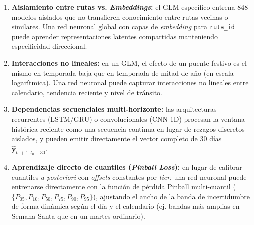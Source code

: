 \documentclass[11pt,a4paper]{article}
\begin{document}
\begin{enumerate}[leftmargin=1.5em]
    \item \textbf{Aislamiento entre rutas vs. \textit{Embeddings}:} el GLM específico entrena 848 modelos aislados que no transfieren conocimiento entre rutas vecinas o similares. Una red neuronal global con capas de \textit{embedding} para \texttt{ruta\_id} puede aprender representaciones latentes compartidas manteniendo especificidad direccional.
    \item \textbf{Interacciones no lineales:} en un GLM, el efecto de un puente festivo es el mismo en temporada baja que en temporada de mitad de año (en escala logarítmica). Una red neuronal puede capturar interacciones no lineales entre calendario, tendencia reciente y nivel de tránsito.
    \item \textbf{Dependencias secuenciales multi-horizonte:} las arquitecturas recurrentes (LSTM/GRU) o convolucionales (CNN-1D) procesan la ventana histórica reciente como una secuencia continua en lugar de rezagos discretos aislados, y pueden emitir directamente el vector completo de 30 días $\hat{\mathbf{y}}_{t_0+1:t_0+30}$.
    \item \textbf{Aprendizaje directo de cuantiles (\textit{Pinball Loss}):} en lugar de calibrar cuantiles \textit{a posteriori} con \textit{offsets} constantes por \textit{tier}, una red neuronal puede entrenarse directamente con la función de pérdida Pinball multi-cuantil ($\{P_{05}, P_{10}, P_{50}, P_{75}, P_{90}, P_{95}\}$), ajustando el ancho de la banda de incertidumbre de forma dinámica según el día y el calendario (ej. bandas más amplias en Semana Santa que en un martes ordinario).
\end{enumerate}
\end{document}
